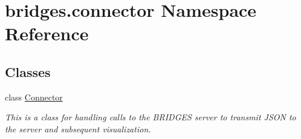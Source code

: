 \hypertarget{namespacebridges_1_1connector}{}\section{bridges.\+connector Namespace Reference}
\label{namespacebridges_1_1connector}
\subsection*{Classes}
\begin{DoxyCompactItemize}
\item 
class \mbox{\hyperlink{classbridges_1_1connector_1_1_connector}{Connector}}
\begin{DoxyCompactList}\small\item\em This is a class for handling calls to the B\+R\+I\+D\+G\+ES server to transmit J\+S\+ON to the server and subsequent visualization. \end{DoxyCompactList}\end{DoxyCompactItemize}
